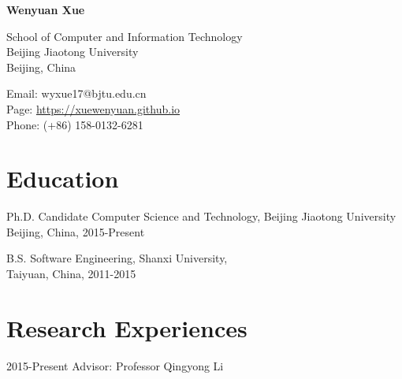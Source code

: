 \documentclass[12pt,letterpaper]{report}
\newcommand{\myname}{Wenyuan Xue}
\newcommand{\namefont}[1]{{\normalfont\bfseries\Huge{#1}}}
\begin{document}
	\raggedright

	\namefont{\myname}

	\vspace{1em}
	\begin{minipage}[t]{0.6\textwidth}
		School of Computer and Information Technology \\
		Beijing Jiaotong University \\
		Beijing, China
	\end{minipage}
	\begin{minipage}[t]{0.39\textwidth}
		Email: wyxue17@bjtu.edu.cn \\
		Page: \href{https://xuewenyuan.github.io}{https://xuewenyuan.github.io} \\
		Phone: (+86) 158-0132-6281
	\end{minipage}
	\vspace{0.5em}


	\section*{Education}

	\begin{tablist}

		\item[Ph.D. Candidate] \tab Computer Science and Technology, Beijing Jiaotong University \\
		\tab Beijing, China, 2015-Present

		\item[B.S.] \tab \tab Software Engineering, Shanxi University, \\
		\tab Taiyuan, China, 2011-2015

	\end{tablist}



	\section*{Research Experiences}

  \begin{tablist}
	  \item[2015-Present] \tab  Advisor: Professor Qingyong Li
	\end{tablist}
\end{document}
